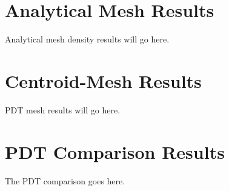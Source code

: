 \section{Analytical Mesh Results}
Analytical mesh density results will go here.

\section{Centroid-Mesh Results}

PDT mesh results will go here.

\section{PDT Comparison Results}

The PDT comparison goes here.
